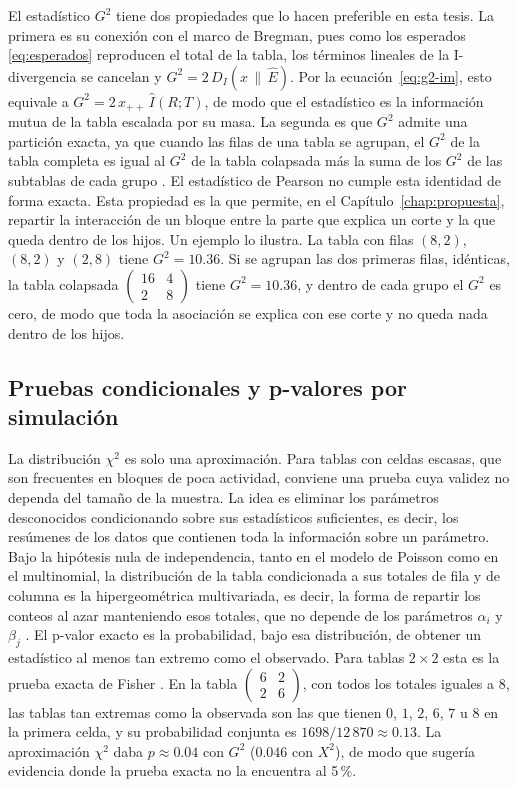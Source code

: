 El estadístico $G^2$ tiene dos propiedades que lo hacen preferible en esta tesis.
La primera es su conexión con el marco de Bregman, pues como los esperados
\eqref{eq:esperados} reproducen el total de la tabla, los términos lineales de la
I-divergencia se cancelan y $G^2 = 2\,D_I(x \,\|\, \hat{E})$. Por la
ecuación~\eqref{eq:g2-im}, esto equivale a $G^2 = 2\,x_{++}\,\hat{I}(R;T)$, de modo
que el estadístico es la información mutua de la tabla escalada por su masa. La
segunda es que $G^2$ admite una partición exacta, ya que cuando las filas de una tabla se
agrupan, el $G^2$ de la tabla completa es igual al $G^2$ de la tabla colapsada más
la suma de los $G^2$ de las subtablas de cada grupo \citep{Agresti2013}. El
estadístico de Pearson no cumple esta identidad de forma exacta. Esta propiedad
es la que permite, en el Capítulo~\ref{chap:propuesta}, repartir la interacción
de un bloque entre la parte que explica un corte y la que queda dentro de los
hijos. Un ejemplo lo ilustra. La tabla con filas $(8,2)$, $(8,2)$ y $(2,8)$ tiene
$G^2 = 10.36$. Si se agrupan las dos primeras filas, idénticas, la tabla colapsada
$\begin{pmatrix} 16 & 4 \\ 2 & 8 \end{pmatrix}$ tiene $G^2 = 10.36$, y dentro de
cada grupo el $G^2$ es cero, de modo que toda la asociación se explica con ese
corte y no queda nada dentro de los hijos.

\subsection{Pruebas condicionales y p-valores por simulación}\label{sec:est-permutacion}

La distribución $\chi^2$ es solo una aproximación. Para tablas con celdas
escasas, que son frecuentes en bloques de poca actividad, conviene una prueba cuya
validez no dependa del tamaño de la muestra. La idea es eliminar los parámetros
desconocidos condicionando sobre sus estadísticos suficientes, es decir, los resúmenes de los datos que contienen toda la información sobre un parámetro. Bajo la hipótesis
nula de independencia, tanto en el modelo de Poisson como en el multinomial, la
distribución de la tabla condicionada a sus totales de fila y de columna es la
hipergeométrica multivariada, es decir, la forma de repartir los conteos al azar
manteniendo esos totales, que no depende de los parámetros $\alpha_i$ y
$\beta_j$ \citep{Agresti2013}. El p-valor exacto es la probabilidad, bajo esa
distribución, de obtener un estadístico al menos tan extremo como el observado.
Para tablas $2 \times 2$ esta es la prueba exacta de Fisher \citep{Agresti2013}. En la tabla
$\begin{pmatrix} 6 & 2 \\ 2 & 6 \end{pmatrix}$, con todos los totales iguales a
$8$, las tablas tan extremas como la observada son las que tienen $0$, $1$, $2$,
$6$, $7$ u $8$ en la primera celda, y su probabilidad conjunta es
$1698/12\,870 \approx 0.13$. La aproximación $\chi^2$ daba $p \approx 0.04$ con $G^2$ ($0.046$ con $X^2$), de
modo que sugería evidencia donde la prueba exacta no la encuentra al 5\,\%.

